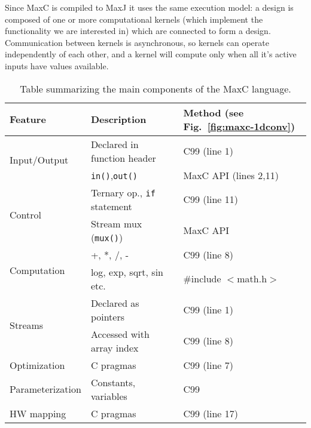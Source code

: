 Since MaxC is compiled to MaxJ it uses the same execution model: a
design is composed of one or more computational kernels (which
implement the functionality we are interested in) which are connected
to form a design. Communication between kernels is asynchronous, so
kernels can operate independently of each other, and a kernel will
compute only when all it's active inputs have values available.

\begin{table}[!h]
  \centering
\renewcommand{\arraystretch}{1.2}
\caption{Table summarizing the main components of the MaxC language.}
\label{table:maxc-features}
\begin{tabular}{l|l|l}
\hline
\bf{Feature}                   & \bf{Description}                   & \bf{Method (see Fig.~\ref{fig:maxc-1dconv})} \\
\hline\hline
  \multirow{2}{*}{Input/Output}         & Declared in function header          & C99 (line 1)                                 \\\cline{2-3}       & \texttt{in()},\texttt{out()}  & MaxC API (lines 2,11) \\
\hline
  \multirow{2}{*}{Control}     & Ternary op., \texttt{if} statement & C99 (line 11)                                \\\cline{2-3}      & Stream mux (\texttt{mux()})       & MaxC API  \\
\hline
\multirow{2}{*}{Computation} & +, *, /, -                         & C99 (line 8)                           \\\cline{2-3} & log, exp, sqrt, sin etc.  & \#include $<$math.h$>$  \\
\hline
  \multirow{2}{*}{Streams}     & Declared as pointers               & C99 (line 1)                                 \\\cline{2-3}       & Accessed with array index & C99 (line 8) \\
\hline
  Optimization                 & C pragmas                   & C99 (line 7)                                 \\
\hline
  Parameterization             & Constants, variables                   & C99                                          \\
\hline
HW mapping                  & C pragmas                   & C99 (line 17)                                \\
\end{tabular}
\end{table}

